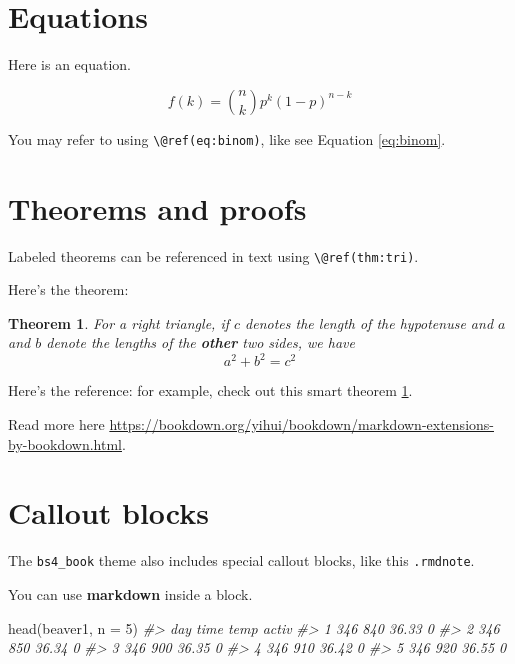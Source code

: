\documentclass[
]{book}
\newenvironment{Shaded}{\begin{snugshade}}{\end{snugshade}}
\newcommand{\AttributeTok}[1]{\textcolor[rgb]{0.77,0.63,0.00}{#1}}
\newcommand{\CommentTok}[1]{\textcolor[rgb]{0.56,0.35,0.01}{\textit{#1}}}
\newcommand{\DecValTok}[1]{\textcolor[rgb]{0.00,0.00,0.81}{#1}}
\newcommand{\FunctionTok}[1]{\textcolor[rgb]{0.00,0.00,0.00}{#1}}
\newcommand{\NormalTok}[1]{#1}
\newtheorem{theorem}{Theorem}[chapter]
\theoremstyle{definition}
\theoremstyle{definition}
\theoremstyle{definition}
\theoremstyle{definition}
\theoremstyle{remark}
\begin{document}
\hypertarget{equations}{%
\section{Equations}\label{equations}}

Here is an equation.

\begin{equation} 
  f\left(k\right) = \binom{n}{k} p^k\left(1-p\right)^{n-k}
  \label{eq:binom}
\end{equation}

You may refer to using \texttt{\textbackslash{}@ref(eq:binom)}, like see Equation \eqref{eq:binom}.

\hypertarget{theorems-and-proofs}{%
\section{Theorems and proofs}\label{theorems-and-proofs}}

Labeled theorems can be referenced in text using \texttt{\textbackslash{}@ref(thm:tri)}.

Here's the theorem:

\begin{theorem}
\protect\hypertarget{thm:tri}{}\label{thm:tri}For a right triangle, if \(c\) denotes the \emph{length} of the hypotenuse
and \(a\) and \(b\) denote the lengths of the \textbf{other} two sides, we have
\[a^2 + b^2 = c^2\]
\end{theorem}

Here's the reference: for example, check out this smart theorem \ref{thm:tri}.

Read more here \url{https://bookdown.org/yihui/bookdown/markdown-extensions-by-bookdown.html}.

\hypertarget{callout-blocks}{%
\section{Callout blocks}\label{callout-blocks}}

The \texttt{bs4\_book} theme also includes special callout blocks, like this \texttt{.rmdnote}.

You can use \textbf{markdown} inside a block.

\begin{Shaded}
\begin{Highlighting}[]
\FunctionTok{head}\NormalTok{(beaver1, }\AttributeTok{n =} \DecValTok{5}\NormalTok{)}
\CommentTok{\#\textgreater{}   day time  temp activ}
\CommentTok{\#\textgreater{} 1 346  840 36.33     0}
\CommentTok{\#\textgreater{} 2 346  850 36.34     0}
\CommentTok{\#\textgreater{} 3 346  900 36.35     0}
\CommentTok{\#\textgreater{} 4 346  910 36.42     0}
\CommentTok{\#\textgreater{} 5 346  920 36.55     0}
\end{Highlighting}
\end{Shaded}
\end{document}
